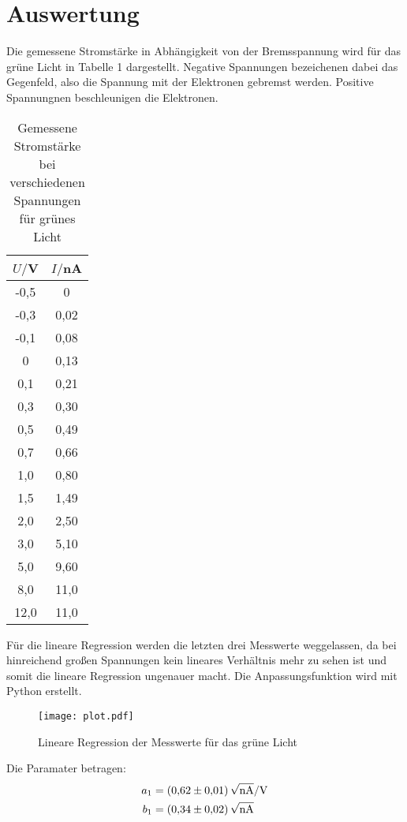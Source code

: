 \section{Auswertung}
\label{sec:Auswertung}



Die gemessene Stromstärke in Abhängigkeit von der Bremsspannung wird für das grüne
Licht in Tabelle 1 dargestellt. Negative Spannungen bezeichenen dabei das Gegenfeld, also
die Spannung mit der Elektronen gebremst werden. Positive Spannungnen beschleunigen die Elektronen.


\begin{table}[H]
  \centering
  \caption{Gemessene Stromstärke bei verschiedenen Spannungen für grünes Licht}
  \label{tab:Spannungsamplitude}
  \begin{tabular}{c c}
    \toprule
    $U/$V & $I/$nA \\
    \midrule
    -0,5 & 0 \\
    -0,3 & 0,02 \\
    -0,1 & 0,08 \\
     0	 & 0,13 \\
     0,1 & 0,21 \\
     0,3 & 0,30 \\
     0,5 & 0,49 \\
     0,7 & 0,66 \\
     1,0 & 0,80 \\
     1,5 & 1,49 \\
     2,0 & 2,50 \\
     3,0 & 5,10 \\
     5,0 & 9,60 \\
     8,0 & 11,0 \\
    12,0 & 11,0 \\
    \bottomrule
  \end{tabular}
\end{table}

Für die lineare Regression werden die letzten drei Messwerte weggelassen, da bei hinreichend
großen Spannungen kein lineares Verhältnis mehr zu sehen ist und somit die lineare Regression
ungenauer macht. Die Anpassungsfunktion wird mit Python erstellt.

\begin{figure}[H]
  \centering
  \texttt{[image: plot.pdf]}
  \caption{Lineare Regression der Messwerte für das grüne Licht}
  \label{fig:plot}
\end{figure}

Die Paramater betragen:
\begin{align*}
  a_1 &= \SI{0.62(1)}{\sqrt{\nano\ampere}\per\volt} \\
  b_1 &= \SI{0.34(2)}{\sqrt{\nano\ampere}}
\end{align*}

